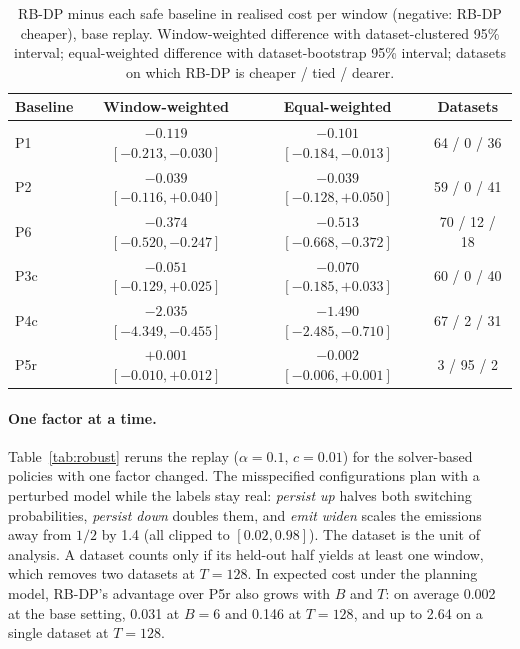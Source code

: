 \documentclass{article}
\theoremstyle{plain}
\theoremstyle{definition}
\theoremstyle{remark}
\begin{document}
\begin{table}[h]
\centering
\caption{RB-DP minus each safe baseline in realised cost per window (negative: RB-DP cheaper), base replay. Window-weighted difference with dataset-clustered 95\% interval; equal-weighted difference with dataset-bootstrap 95\% interval; datasets on which RB-DP is cheaper / tied / dearer.}
\label{tab:cluster}
\small
\begin{tabular}{lccc}
\toprule
Baseline & Window-weighted & Equal-weighted & Datasets\\
\midrule
P1 & $-0.119$ $[-0.213,-0.030]$ & $-0.101$ $[-0.184,-0.013]$ & 64 / 0 / 36\\
P2 & $-0.039$ $[-0.116,+0.040]$ & $-0.039$ $[-0.128,+0.050]$ & 59 / 0 / 41\\
P6 & $-0.374$ $[-0.520,-0.247]$ & $-0.513$ $[-0.668,-0.372]$ & 70 / 12 / 18\\
P3c & $-0.051$ $[-0.129,+0.025]$ & $-0.070$ $[-0.185,+0.033]$ & 60 / 0 / 40\\
P4c & $-2.035$ $[-4.349,-0.455]$ & $-1.490$ $[-2.485,-0.710]$ & 67 / 2 / 31\\
P5r & $+0.001$ $[-0.010,+0.012]$ & $-0.002$ $[-0.006,+0.001]$ & 3 / 95 / 2\\
\bottomrule
\end{tabular}
\end{table}

\paragraph{One factor at a time.} Table~\ref{tab:robust} reruns the replay ($\alpha=0.1$, $c=0.01$) for the solver-based policies with one factor changed. The misspecified configurations plan with a perturbed model while the labels stay real: \emph{persist up} halves both switching probabilities, \emph{persist down} doubles them, and \emph{emit widen} scales the emissions away from $1/2$ by 1.4 (all clipped to $[0.02,0.98]$). The dataset is the unit of analysis. A dataset counts only if its held-out half yields at least one window, which removes two datasets at $T=128$. In expected cost under the planning model, RB-DP's advantage over P5r also grows with $B$ and $T$: on average 0.002 at the base setting, 0.031 at $B=6$ and 0.146 at $T=128$, and up to 2.64 on a single dataset at $T=128$.
\end{document}
